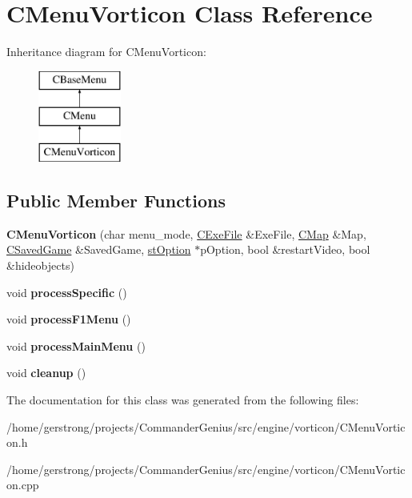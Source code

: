 \hypertarget{class_c_menu_vorticon}{
\section{CMenuVorticon Class Reference}
\label{class_c_menu_vorticon}
}
Inheritance diagram for CMenuVorticon:\begin{figure}[H]
\begin{center}
\leavevmode
\includegraphics[height=3cm]{class_c_menu_vorticon}
\end{center}
\end{figure}
\subsection*{Public Member Functions}
\begin{DoxyCompactItemize}
\item 
\hypertarget{class_c_menu_vorticon_a05dd693f310abe08b0dd5fb0c35bd3a8}{
{\bfseries CMenuVorticon} (char menu\_\-mode, \hyperlink{class_c_exe_file}{CExeFile} \&ExeFile, \hyperlink{class_c_map}{CMap} \&Map, \hyperlink{class_c_saved_game}{CSavedGame} \&SavedGame, \hyperlink{structst_option}{stOption} $\ast$pOption, bool \&restartVideo, bool \&hideobjects)}
\label{class_c_menu_vorticon_a05dd693f310abe08b0dd5fb0c35bd3a8}

\item 
\hypertarget{class_c_menu_vorticon_ae10a1083dcc2a3e8fa97798ebac62cc7}{
void {\bfseries processSpecific} ()}
\label{class_c_menu_vorticon_ae10a1083dcc2a3e8fa97798ebac62cc7}

\item 
\hypertarget{class_c_menu_vorticon_a6438a54cca76da71bbe0c8a7f1d2f53d}{
void {\bfseries processF1Menu} ()}
\label{class_c_menu_vorticon_a6438a54cca76da71bbe0c8a7f1d2f53d}

\item 
\hypertarget{class_c_menu_vorticon_a8b7616f8c34ca413e81dbc685fed6edd}{
void {\bfseries processMainMenu} ()}
\label{class_c_menu_vorticon_a8b7616f8c34ca413e81dbc685fed6edd}

\item 
\hypertarget{class_c_menu_vorticon_ae3edcadcb96257e6d5d30231da34244a}{
void {\bfseries cleanup} ()}
\label{class_c_menu_vorticon_ae3edcadcb96257e6d5d30231da34244a}

\end{DoxyCompactItemize}


The documentation for this class was generated from the following files:\begin{DoxyCompactItemize}
\item 
/home/gerstrong/projects/CommanderGenius/src/engine/vorticon/CMenuVorticon.h\item 
/home/gerstrong/projects/CommanderGenius/src/engine/vorticon/CMenuVorticon.cpp\end{DoxyCompactItemize}
